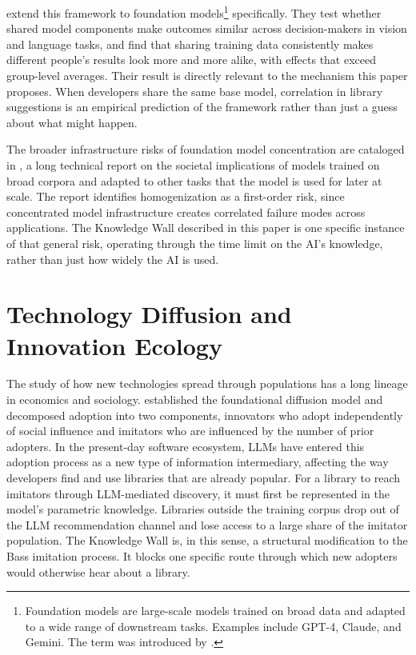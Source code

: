\documentclass[12pt, a4paper]{report}
\begin{document}
\citet{bommasani2022picking} extend this framework to foundation models\footnote{Foundation models are large-scale models trained on broad data and adapted to a wide range of downstream tasks. Examples include GPT-4, Claude, and Gemini. The term was introduced by \citet{bommasani2022foundation}.} specifically. They test whether shared model components make outcomes similar across decision-makers in vision and language tasks, and find that sharing training data consistently makes different people’s results look more and more alike, with effects that exceed group-level averages. Their result is directly relevant to the mechanism this paper proposes. When developers share the same base model, correlation in library suggestions is an empirical prediction of the framework rather than just a guess about what might happen.

The broader infrastructure risks of foundation model concentration are cataloged in \citet{bommasani2022foundation}, a long technical report on the societal implications of models trained on broad corpora and adapted to other tasks that the model is used for later at scale. The report identifies homogenization as a first-order risk, since concentrated model infrastructure creates correlated failure modes across applications. The Knowledge Wall described in this paper is one specific instance of that general risk, operating through the time limit on the AI’s knowledge, rather than just how widely the AI is used.

\section{Technology Diffusion and Innovation Ecology}\label{sec:lit-diffusion}

The study of how new technologies spread through populations has a long lineage in economics and sociology. \citet{bass1969new} established the foundational diffusion model and decomposed adoption into two components, innovators who adopt independently of social influence and imitators who are influenced by the number of prior adopters. In the present-day software ecosystem, LLMs have entered this adoption process as a new type of information intermediary, affecting the way developers find and use libraries that are already popular. For a library to reach imitators through LLM-mediated discovery, it must first be represented in the model's parametric knowledge. Libraries outside the training corpus drop out of the LLM recommendation channel and lose access to a large share of the imitator population. The Knowledge Wall is, in this sense, a structural modification to the Bass imitation process. It blocks one specific route through which new adopters would otherwise hear about a library.
\end{document}
